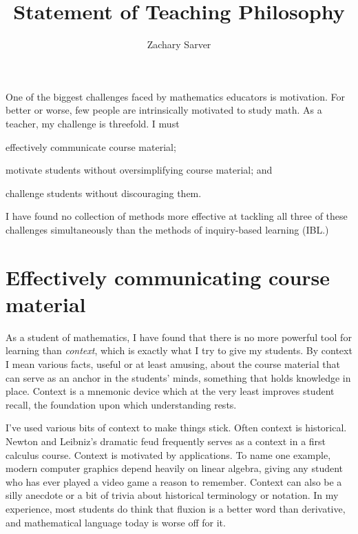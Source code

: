 \documentclass[11pt]{article}
\begin{document}
\fancyhf{}
\lhead[\thepage / \pageref{LastPage}]{Zachary Sarver}


\title{Statement of Teaching Philosophy}
\author{Zachary Sarver}
\date{}
\maketitle

One of the biggest challenges faced by mathematics educators is motivation. For
better or worse, few people are intrinsically motivated to study math. As a
teacher, my challenge is threefold. I must
\begin{inparaenum}
\item effectively communicate course material;
\item motivate students without oversimplifying course material; and
\item challenge students without discouraging them.
\end{inparaenum}
I have found no collection of methods more effective at tackling all three of
these challenges simultaneously than the methods of inquiry-based learning
(IBL.)

\section{Effectively communicating course material}

As a student of mathematics, I have found that there is no more powerful tool
for learning than \emph{context}, which is exactly what I try to give my
students. By context I mean various facts, useful or at least amusing, about the
course material that can serve as an anchor in the students' minds, something
that holds knowledge in place. Context is a mnemonic device which at the
very least improves student recall, the foundation upon which
understanding rests.

I've used various bits of context to make things stick. Often context is
historical. Newton and Leibniz's dramatic feud frequently serves as a
context in a first calculus course. Context is motivated by applications. To
name one example, modern computer graphics depend heavily on linear algebra,
giving any student who has ever played a video game a reason to
remember. Context can also be a silly anecdote or a bit of trivia about
historical terminology or notation. In my experience, most students do think
that fluxion is a better word than derivative, and mathematical language today
is worse off for it.
\end{document}
